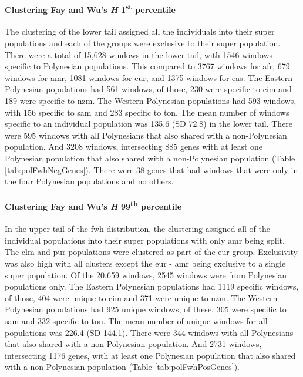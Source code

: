 \documentclass[twoside,openright]{report}
\let\oldparagraph\paragraph
\renewcommand{\paragraph}[1]{\oldparagraph{#1}\mbox{}}
\begin{document}
\paragraph{\texorpdfstring{Clustering Fay and Wu's \emph{H}
1\textsuperscript{st}
percentile}{Clustering Fay and Wu's H 1st percentile}}\label{clustering-fay-and-wus-h-1st-percentile}

The clustering of the lower tail assigned all the individuals into their
super populations and each of the groups were exclusive to their super
population. There were a total of 15,628 windows in the lower tail, with
1546 windows specific to Polynesian populations. This compared to 3767
windows for \gls{afr}, 679 windows for \gls{amr}, 1081 windows for
\gls{eur}, and 1375 windows for \gls{eas}. The Eastern Polynesian
populations had 561 windows, of those, 230 were specific to \gls{cim}
and 189 were specific to \gls{nzm}. The Western Polynesian populations
had 593 windows, with 156 specific to \gls{sam} and 283 specific to
\gls{ton}. The mean number of windows specific to an individual
population was 135.6 (SD 72.8) in the lower tail. There were 595 windows
with all Polynesians that also shared with a non-Polynesian population.
And 3208 windows, intersecting 885 genes with at least one Polynesian
population that also shared with a non-Polynesian population (Table
\ref{tab:polFwhNegGenes}). There were 38 genes that had windows that
were only in the four Polynesian populations and no others.

\paragraph{\texorpdfstring{Clustering Fay and Wu's \emph{H}
99\textsuperscript{th}
percentile}{Clustering Fay and Wu's H 99th percentile}}\label{clustering-fay-and-wus-h-99th-percentile}

In the upper tail of the \gls{fwh} distribution, the clustering assigned
all of the individual populations into their super populations with only
\gls{amr} being split. The \gls{clm} and \gls{pur} populations were
clustered as part of the \gls{eur} group. Exclusivity was also high with
all clusters except the \gls{eur} - \gls{amr} being exclusive to a
single super population. Of the 20,659 windows, 2545 windows were from
Polynesian populations only. The Eastern Polynesian populations had 1119
specific windows, of those, 404 were unique to \gls{cim} and 371 were
unique to \gls{nzm}. The Western Polynesian populations had 925 unique
windows, of these, 305 were specific to \gls{sam} and 332 specific to
\gls{ton}. The mean number of unique windows for all populations was
226.4 (SD 144.1). There were 344 windows with all Polynesians that also
shared with a non-Polynesian population. And 2731 windows, intersecting
1176 genes, with at least one Polynesian population that also shared
with a non-Polynesian population (Table \ref{tab:polFwhPosGenes}).
\end{document}
